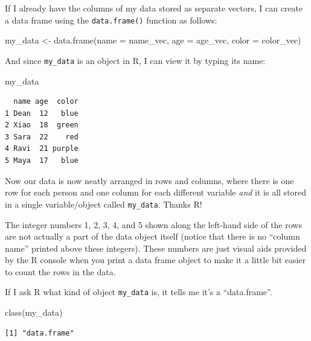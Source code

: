 \documentclass[
  letterpaper,
  DIV=11,
  numbers=noendperiod]{scrreprt}
\newenvironment{Shaded}{\begin{snugshade}}{\end{snugshade}}
\newcommand{\AttributeTok}[1]{\textcolor[rgb]{0.40,0.45,0.13}{#1}}
\newcommand{\FunctionTok}[1]{\textcolor[rgb]{0.28,0.35,0.67}{#1}}
\newcommand{\NormalTok}[1]{\textcolor[rgb]{0.00,0.23,0.31}{#1}}
\newcommand{\OtherTok}[1]{\textcolor[rgb]{0.00,0.23,0.31}{#1}}
\begin{document}
If I already have the columns of my data stored as separate vectors, I
can create a data frame using the \texttt{data.frame()} function as
follows:

\begin{Shaded}
\begin{Highlighting}[]
\NormalTok{my\_data }\OtherTok{\textless{}{-}} \FunctionTok{data.frame}\NormalTok{(}\AttributeTok{name =}\NormalTok{ name\_vec,}
                      \AttributeTok{age =}\NormalTok{ age\_vec, }
                      \AttributeTok{color =}\NormalTok{ color\_vec)}
\end{Highlighting}
\end{Shaded}

And since \texttt{my\_data} is an object in R, I can view it by typing
its name:

\begin{Shaded}
\begin{Highlighting}[]
\NormalTok{my\_data}
\end{Highlighting}
\end{Shaded}

\begin{verbatim}
  name age  color
1 Dean  12   blue
2 Xiao  18  green
3 Sara  22    red
4 Ravi  21 purple
5 Maya  17   blue
\end{verbatim}

Now our data is now neatly arranged in rows and columns, where there is
one row for each person and one column for each different variable
\emph{and} it is all stored in a single variable/object called
\texttt{my\_data}. Thanks R!

The integer numbers 1, 2, 3, 4, and 5 shown along the left-hand side of
the rows are not actually a part of the data object itself (notice that
there is no ``column name'' printed above these integers). These numbers
are just visual aids provided by the R console when you print a data
frame object to make it a little bit easier to count the rows in the
data.

If I ask R what kind of object \texttt{my\_data} is, it tells me it's a
``data.frame''.

\begin{Shaded}
\begin{Highlighting}[]
\FunctionTok{class}\NormalTok{(my\_data)}
\end{Highlighting}
\end{Shaded}

\begin{verbatim}
[1] "data.frame"
\end{verbatim}
\end{document}
